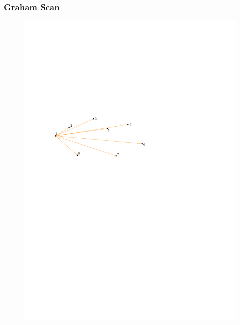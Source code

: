 \begin{frame}
	\frametitle{{Graham Scan}}
\begin{figure}[htbp]
	\begin{center}
  	\includegraphics[width=.8\linewidth]{bilder/scan1}
	\end{center}
\end{figure}
\end{frame}

